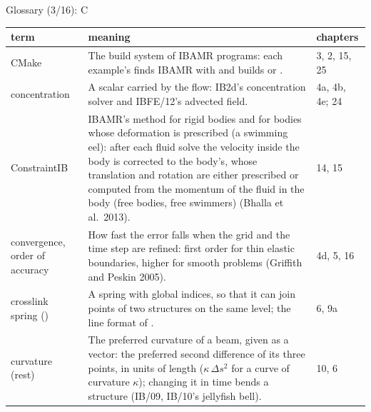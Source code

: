 \documentclass[aspectratio=169,11pt]{beamer}
\makeatletter
\newenvironment{glossarytable}{\scriptsize\renewcommand{\arraystretch}{1.08}%
  \begin{tabular}{@{}L{0.19\textwidth}L{0.63\textwidth}L{0.12\textwidth}@{}}\toprule
  term & meaning & chapters\\\midrule}{\bottomrule\end{tabular}}
\makeatother
\begin{document}
\begin{frame}{Glossary (3/16): C}
\label{fr:g3}
\begin{glossarytable}
CMake & The build system of IBAMR programs: each example's  finds IBAMR with  and builds  or . & 3, 2, 15, 25\\
concentration & A scalar carried by the flow: IB2d's concentration solver and IBFE/12's advected field. & 4a, 4b, 4e; 24\\
ConstraintIB & IBAMR's method for rigid bodies and for bodies whose deformation is prescribed (a swimming eel): after each fluid solve the velocity inside the body is corrected to the body's, whose translation and rotation are either prescribed or computed from the momentum of the fluid in the body (free bodies, free swimmers) (Bhalla et al.\ 2013). & 14, 15\\
convergence, order of accuracy & How fast the error falls when the grid and the time step are refined: first order for thin elastic boundaries, higher for smooth problems (Griffith and Peskin 2005). & 4d, 5, 16\\
crosslink spring () & A spring with global indices, so that it can join points of two structures on the same level; the line format of . & 6, 9a\\
curvature (rest) & The preferred curvature of a beam, given as a vector: the preferred second difference of its three points, in units of length ($\kappa\,\Delta s^2$ for a curve of curvature $\kappa$); changing it in time bends a structure (IB/09, IB/10's jellyfish bell). & 10, 6\\
\end{glossarytable}
\end{frame}
\end{document}
